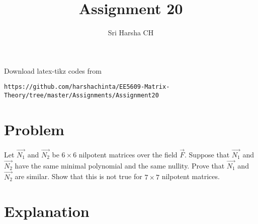 \documentclass[journal,12pt]{IEEEtran}
\begin{document}
     \def\rightbox#1{\makebox[0in][r]{#1}}
     \def\centbox#1{\makebox[0in]{#1}}
     \def\topbox#1{\raisebox{-\baselineskip}[0in][0in]{#1}}
     \def\midbox#1{\raisebox{-0.5\baselineskip}[0in][0in]{#1}}
\vspace{3cm}
\title{Assignment 20}
\author{Sri Harsha CH}
\maketitle
\bigskip
\renewcommand{\thefigure}{\theenumi}
\renewcommand{\thetable}{\theenumi}
Download latex-tikz codes from 
%
\begin{lstlisting}
https://github.com/harshachinta/EE5609-Matrix-Theory/tree/master/Assignments/Assignment20
\end{lstlisting}
%
 
\section{Problem}
Let $\vec{N_1}$ and $\vec{N_2}$ be $6 \times 6$ nilpotent matrices over the field $\vec{F}$. Suppose that $\vec{N_1}$ and $\vec{N_2}$ have the same minimal polynomial and the same nullity. Prove that $\vec{N_1}$ and $\vec{N_2}$ are similar. Show that this is not true for $7 \times 7$ nilpotent matrices.
%
\section{\textbf{Explanation}}
\end{document}
